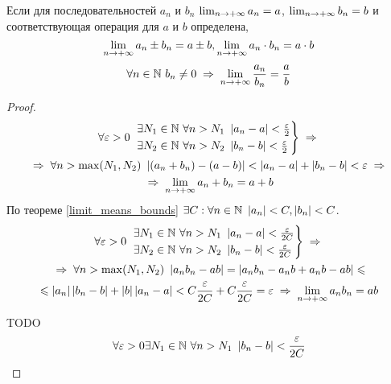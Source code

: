 \begin{theorem}
    Если для последовательностей $a_n$ и $b_n$ $\lim_{n\to+\infty} a_n = a$, $\lim_{n\to+\infty} b_n = b$ и соответствующая операция для $a$ и $b$ определена,
    \[ \lim_{n\to+\infty} a_n \pm b_n = a \pm b, \lim_{n\to+\infty} a_n \cdot b_n = a \cdot b \]
    \[ \forall n \in \N\ b_n \ne 0 \thus \limpinf \frac{a_n}{b_n} = \frac{a}{b} \]
\end{theorem}
\begin{proof}
    \begin{multline*}
        \forall \varepsilon > 0\ 
        \begin{rcases}
            \exists N_1 \in \N\ \forall n > N_1\ \abs{a_n - a} < \frac{\varepsilon}{2} \\
            \exists N_2 \in \N\ \forall n > N_2\ \abs{b_n - b} < \frac{\varepsilon}{2}
        \end{rcases} \thus \\
        \thus \forall n > \max(N_1, N_2)\ \abs{(a_n + b_n) - (a - b)} <
        \abs{a_n - a} + \abs{b_n - b} < \varepsilon \thus \\
        \thus \limpinf{a_n + b_n} = a + b
    \end{multline*}
    По теореме \ref{limit_means_bounds} $\exists C : \forall n\in\mathbb{N}\ \left\lvert a_n \right\rvert < C, \left\lvert b_n \right\rvert < C$.
    \begin{multline*}
        \forall \varepsilon > 0\ 
        \begin{rcases}
            \exists N_1 \in \N\ \forall n > N_1\ \abs{a_n - a} < \frac{\varepsilon}{2C} \\
            \exists N_2 \in \N\ \forall n > N_2\ \abs{b_n - b} < \frac{\varepsilon}{2C}
        \end{rcases} \thus \\
        \thus \forall n > \max(N_1, N_2)\ \abs{a_n b_n - ab} = \abs{a_n b_n - a_n b + a_n b - ab} \le \\
        \le \abs{a_n} \abs{b_n - b} + \abs{b} \abs{a_n - a} <
        C \frac{\varepsilon}{2C} + C \frac{\varepsilon}{2C} = \varepsilon \thus
        \limpinf{a_n b_n} = a b
    \end{multline*}

    TODO %
    \begin{multline*}
        \forall \varepsilon > 0 \exists N_1 \in \mathbb{N}\ \forall n > N_1\ \left\lvert b_n - b \right\rvert < \frac{\varepsilon}{2C} \\
    \end{multline*}
     
\end{proof}

